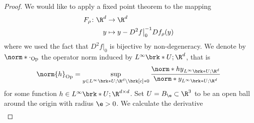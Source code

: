 \begin{proof}
  We would like to apply a fixed point theorem to the mapping
  \begin{align*}
    F_\rho\colon \R^d&\to\R^d \\
    y&\mapsto y -D^2f\big\vert_0^{-1}Df_\rho(y)
  \end{align*}
  where we used the fact that $D^2f\big\vert_0$ is bijective by non-degeneracy.
  We denote by $\norm*{\cdot}_{\text{Op}}$ the operator norm induced by $L^\infty\brk*{U;\R^d}$, that is
  \begin{align*}
    \norm{h}_{\text{Op}}=\sup_{y\in L^\infty\brk*{U;\R^d}\setminus\brk[c]*{0}}\frac{\norm*{hy}_{L^\infty\brk*{U;\R^d}}}{\norm*{y}_{L^\infty\brk*{U;\R^d}}}
  \end{align*}
  for some function $h\in L^\infty\brk*{U;\R^{d\times d}}$.
  Set $U=B_\e\subset\R^3$ to be an open ball around the origin with radius $\e>0$.
  We calculate the derivative
  \begin{align*}

\end{align*}
\end{proof}

